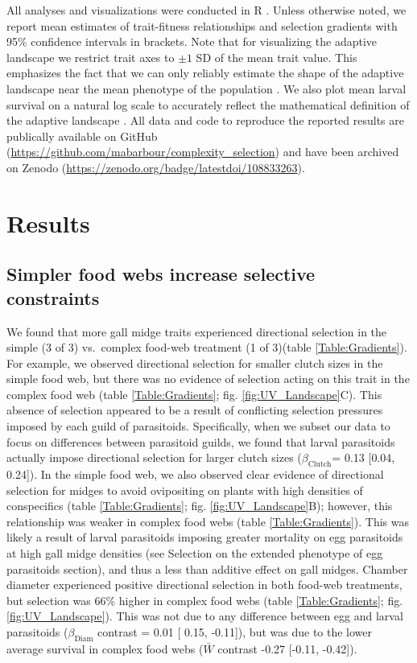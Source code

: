 \documentclass[11pt,]{article}
\begin{document}
All analyses and visualizations were conducted in R \citep{R2018}.
Unless otherwise noted, we report mean estimates of trait-fitness
relationships and selection gradients with 95\% confidence intervals in
brackets. Note that for visualizing the adaptive landscape we restrict
trait axes to \(\pm 1\) SD of the mean trait value. This emphasizes the
fact that we can only reliably estimate the shape of the adaptive
landscape near the mean phenotype of the population \citep{Arnold2001}.
We also plot mean larval survival on a natural log scale to accurately
reflect the mathematical definition of the adaptive landscape
\citep{Arnold2003}. All data and code to reproduce the reported results
are publically available on GitHub
(\url{https://github.com/mabarbour/complexity_selection}) and have been
archived on Zenodo (\url{https://zenodo.org/badge/latestdoi/108833263}).

\section{Results}\label{results}

\subsection{Simpler food webs increase selective
constraints}\label{simpler-food-webs-increase-selective-constraints}

\indent We found that more gall midge traits experienced directional
selection in the simple (3 of 3) vs.~complex food-web treatment (1 of
3)(table \ref{Table:Gradients}). For example, we observed directional
selection for smaller clutch sizes in the simple food web, but there was
no evidence of selection acting on this trait in the complex food web
(table \ref{Table:Gradients}; fig. \ref{fig:UV_Landscape}C). This
absence of selection appeared to be a result of conflicting selection
pressures imposed by each guild of parasitoids. Specifically, when we
subset our data to focus on differences between parasitoid guilds, we
found that larval parasitoids actually impose directional selection for
larger clutch sizes (\(\beta_{\text{Clutch}}\)= 0.13 {[}0.04, 0.24{]}).
In the simple food web, we also observed clear evidence of directional
selection for midges to avoid ovipositing on plants with high densities
of conspecifics (table \ref{Table:Gradients}; fig.
\ref{fig:UV_Landscape}B); however, this relationship was weaker in
complex food webs (table \ref{Table:Gradients}). This was likely a
result of larval parasitoids imposing greater mortality on egg
parasitoids at high gall midge densities (see Selection on the extended
phenotype of egg parasitoids section), and thus a less than additive
effect on gall midges. Chamber diameter experienced positive directional
selection in both food-web treatments, but selection was 66\% higher in
complex food webs (table \ref{Table:Gradients}; fig.
\ref{fig:UV_Landscape}). This was not due to any difference between egg
and larval parasitoids (\(\beta_{\text{Diam}}\) contrast = 0.01 {[}
0.15, -0.11{]}), but was due to the lower average survival in complex
food webs (\(\bar W\) contrast -0.27 {[}-0.11, -0.42{]}).
\end{document}
